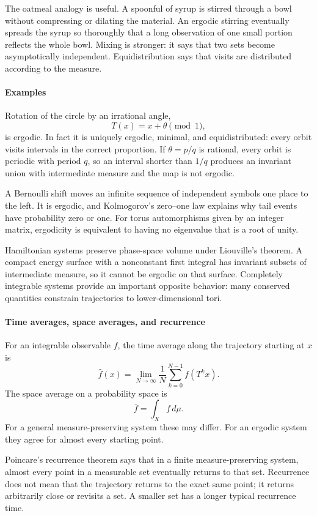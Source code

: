 The oatmeal analogy is useful. A spoonful of syrup is stirred through a bowl without compressing or dilating the material. An ergodic stirring eventually spreads the syrup so thoroughly that a long observation of one small portion reflects the whole bowl. Mixing is stronger: it says that two sets become asymptotically independent. Equidistribution says that visits are distributed according to the measure.

\paragraph{Examples}

Rotation of the circle by an irrational angle,
\[
 T(x)=x+\theta\pmod 1,
\]
is ergodic. In fact it is uniquely ergodic, minimal, and equidistributed: every orbit visits intervals in the correct proportion. If $\theta=p/q$ is rational, every orbit is periodic with period $q$, so an interval shorter than $1/q$ produces an invariant union with intermediate measure and the map is not ergodic.

A Bernoulli shift moves an infinite sequence of independent symbols one place to the left. It is ergodic, and Kolmogorov's zero--one law explains why tail events have probability zero or one. For torus automorphisms given by an integer matrix, ergodicity is equivalent to having no eigenvalue that is a root of unity.

Hamiltonian systems preserve phase-space volume under Liouville's theorem. A compact energy surface with a nonconstant first integral has invariant subsets of intermediate measure, so it cannot be ergodic on that surface. Completely integrable systems provide an important opposite behavior: many conserved quantities constrain trajectories to lower-dimensional tori. \cite{ergodic_theory_ref2,ergodic_theory_ref3}

\paragraph{Time averages, space averages, and recurrence}

For an integrable observable $f$, the time average along the trajectory starting at $x$ is
\[
 \widehat f(x)=\lim_{N\to\infty}
 \frac1N\sum_{k=0}^{N-1}f(T^kx).
\]
The space average on a probability space is
\[
 \overline f=\int_Xf\,d\mu.
\]
For a general measure-preserving system these may differ. For an ergodic system they agree for almost every starting point.

Poincare's recurrence theorem says that in a finite measure-preserving system, almost every point in a measurable set eventually returns to that set. Recurrence does not mean that the trajectory returns to the exact same point; it returns arbitrarily close or revisits a set. A smaller set has a longer typical recurrence time.

